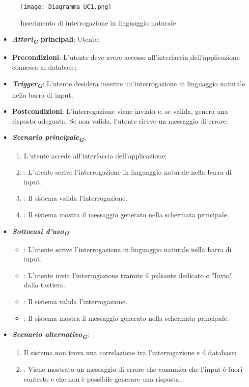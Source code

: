 \begin{figure}[h]
    \centering
    \texttt{[image: Diagramma UC1.png]}
    \caption{Inserimento di interrogazione in linguaggio naturale}
\end{figure}

\begin{itemize}
    \item \textbf{\emph{Attori}\textsubscript{\textbf{\textit{G}}} principali}: Utente;
    \item \textbf{Precondizioni}: L'utente deve avere accesso all'interfaccia dell'applicazione connessa al database;
    \item \textbf{\emph{Trigger}\textsubscript{\textbf{\textit{G}}}}: L'utente desidera inserire un'interrogazione in linguaggio naturale nella barra di input;
    \item \textbf{Postcondizioni}: L'interrogazione viene inviata e, se valida, genera una risposta adeguata. Se non valida, l'utente riceve un messaggio di errore;
    \item \textbf{\emph{Scenario principale}\textsubscript{\textbf{\textit{G}}}}:
    \begin{enumerate}
        \item L'utente accede all'interfaccia dell'applicazione;
        \item {}: L'utente scrive l'interrogazione in linguaggio naturale nella barra di input.
        \item {}: Il sistema valida l'interrogazione.
        \item {}: Il sistema mostra il messaggio generato nella schermata principale.
    \end{enumerate}
    \item \textbf{\emph{Sottocasi d'uso}\textsubscript{\textbf{\textit{G}}}}:
    \begin{itemize}
        \item {}: L'utente scrive l'interrogazione in linguaggio naturale nella barra di input.
        \item {}: L'utente invia l'interrogazione tramite il pulsante dedicato o "Invio" dalla tastiera.
        \item {}: Il sistema valida l'interrogazione.
        \item {}: Il sistema mostra il messaggio generato nella schermata principale.
    \end{itemize}
    \item \textbf{\emph{Scenario alternativo}\textsubscript{\textbf{\textit{G}}}}:
    \begin{enumerate}
        \item {} Il sistema non trova una correlazione tra l'interrogazione e il database;
        \item {}: Viene mostrato un messaggio di errore che comunica che l'input è fuori contesto e che non è possibile generare una risposta.
    \end{enumerate}
\end{itemize}

